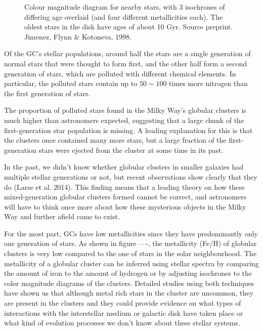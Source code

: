 \begin{figure}[H]
\begin{minipage}[b]{0.55\textwidth}
    \caption[HR Diagram for Stars]{Colour magnitude diagram for nearby stars, with 3 isochrones of differing age overlaid (and four different metallicities each). The oldest stars in the disk have ages of about 10 Gyr. Source preprint. Jimenez, Flynn \& Kotoneva, 1998.}
  \end{minipage}
\end{figure}
 
Of the GC's stellar populations, around half the stars are a single generation of normal stars that were thought to form first, and the other half form a second generation of stars, which are polluted with different chemical elements. In particular, the polluted stars contain up to $50 \sim 100$ times more nitrogen than the first generation of stars.

The proportion of polluted stars found in the Milky Way's globular clusters is much higher than astronomers expected, suggesting that a large chunk of the first-generation star population is missing. A leading explanation for this is that the clusters once contained many more stars, but a large fraction of the first-generation stars were ejected from the cluster at some time in its past.

In the past, we didn't know whether globular clusters in smaller galaxies had multiple stellar generations or not, but recent observations show clearly that they do (Larse et al. 2014). This finding means that a leading theory on how these mixed-generation globular clusters formed cannot be correct, and astronomers will have to think once more about how these mysterious objects in the Milky Way and further afield came to exist.

For the most part, GCs have low metallicities since they have predominantly only one generation of stars. As shown in figure ----, the metallicity (Fe/H) of globular clusters is very low compared to the one of stars in the solar neighbourhood. The metallicity of a globular cluster can be inferred using stellar spectra by comparing the amount of iron  to the amount of hydrogen or by adjusting isochrones to the color magnitude diagrams of the clusters. Detailed studies using both techniques have shown us that although metal rich stars in the cluster are uncommon, they are present in the clusters and they could provide evidence on what types of interactions with the interstellar medium or galactic disk have taken place or what kind of evolution processes we don't know about these stellar systems.

